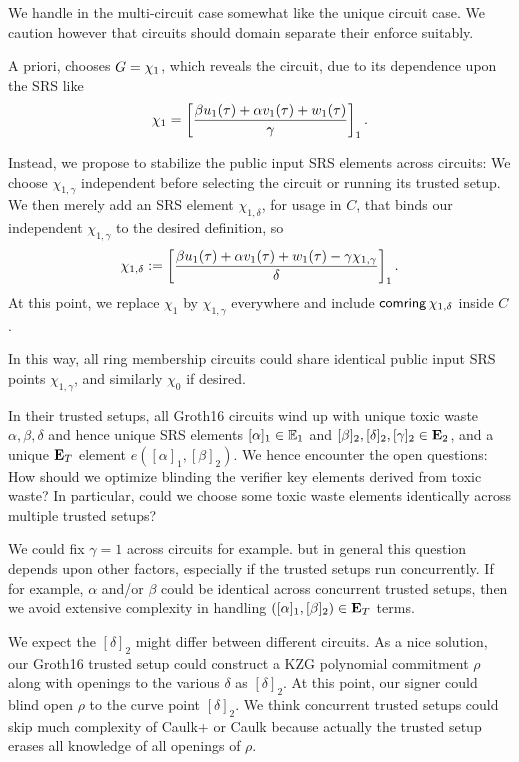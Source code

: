 We handle \comring in the multi-circuit case somewhat like the
unique circuit case.  We caution however that circuits should domain
separate their enforce \comring suitably.

\smallskip

A priori, \pifast chooses $G = \chi_1$, which reveals the circuit,
due to its dependence upon the SRS like
$$ \chi_1 = \left[ {\beta u_1(\tau) + \alpha v_1(\tau) + w_1(\tau) \over \gamma} \right]_1 . $$

Instead, we propose to stabilize the public input SRS elements across circuits:
We choose $\chi_{1,\gamma}$ independent before selecting the circuit
or running its trusted setup.
We then merely add an SRS element $\chi_{1,\delta}$, for usage in $C$, that binds
our independent $\chi_{1,\gamma}$ to the desired definition, so
$$ \chi_{1,\delta} := \left[ {\beta u_1(\tau) + \alpha v_1(\tau) + w_1(\tau) - \gamma \chi_{1,\gamma} \over \delta} \right]_1 . $$
At this point, we replace $\chi_1$ by $\chi_{1,\gamma}$ everywhere and
include $\mathsf{comring} \, \chi_{1,\delta}$ inside $C$.

In this way, all ring membership circuits could share identical
public input SRS points $\chi_{1,\gamma}$, and similarly $\chi_0$ if desired.

\smallskip

In their trusted setups, all Groth16 circuits wind up with unique
toxic waste $\alpha,\beta,\delta$ and hence unique SRS elements
$[\alpha]_1 \in {\mathbb{E}}_1$ and $[\beta]_2, [\delta]_2, [\gamma]_2 \in {\mathbf{E}}_2$,
and a unique ${\mathbf{E}}_T$ element $e([\alpha]_1, [\beta]_2)$.
We hence encounter the open questions:
How should we optimize blinding the verifier key elements derived from toxic waste?
In particular, could we choose some toxic waste elements identically across multiple trusted setups?

We could fix $\gamma=1$ across circuits for example. but in general
this question depends upon other factors, especially if the trusted setups
run concurrently.
If for example, $\alpha$ and/or $\beta$ could be identical across
concurrent trusted setups, then we avoid extensive complexity in
 handling $([\alpha]_1, [\beta]_2) \in {\mathbf{E}}_T$ terms.

We expect the $[\delta]_2$ might differ between different circuits.
As a nice solution, our Groth16 trusted setup could construct a
KZG polynomial commitment $\rho$ along with openings to the
various $\delta$ as $[\delta]_2$.  At this point, our signer could
blind open $\rho$ to the curve point $[\delta]_2$.
We think concurrent trusted setups could skip much complexity of
Caulk+ \cite{caulk+} or Caulk \cite{caulk} because actually the
 trusted setup erases all knowledge of all openings of $\rho$.

\endinput



\subsection{Post-quantum}





\subsection{SnarkPack}

TODO: Handle $\pi$ hashes?


